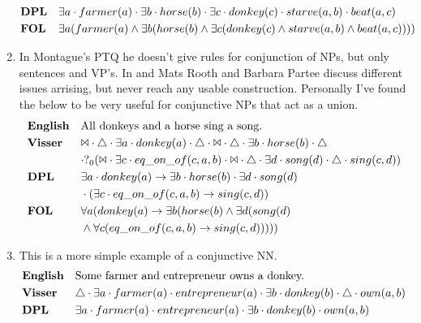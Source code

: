 \documentclass[12pt]{article}
\begin{document}
\begin{enumerate}
\begin{align*}
&\text{\textbf{DPL}}&&\exists a \cdot farmer(a) \cdot \exists b \cdot horse(b) \cdot \exists c \cdot donkey(c) \cdot starve(a,b) \cdot beat(a,c) \\
&\text{\textbf{FOL}}&&\exists a(farmer(a) \wedge \exists b(horse(b) \wedge \exists c(donkey(c) \wedge starve(a,b) \wedge beat(a,c)))) \\
\end{align*}
\item
In Montague's PTQ\cite{montague1973proper} he doesn't give rules for conjunction of NPs, but only sentences and VP's. In \cite{rooth1982conjunction} and \cite{partee1983generalized} Mats Rooth and Barbara Partee discuss different issues arrising, but never reach any usable construction. Personally I've found the below to be very useful for conjunctive NPs that act as a union.
\begin{align*}
&\text{\textbf{English}}&&\text{All donkeys and a horse sing a song.} \\
&\text{\textbf{Visser}}&&\Bowtie \cdot \triangle \cdot \exists a \cdot donkey(a) \cdot \triangle \cdot \Bowtie \cdot \triangle \cdot \exists b \cdot horse(b) \cdot \triangle\\&&& \cdot ?_0(\Bowtie \cdot \exists c \cdot eq\_on\_of(c,a,b) \cdot \Bowtie \cdot \triangle \cdot \exists d \cdot song(d) \cdot \triangle \cdot sing(c,d)) \\
&\text{\textbf{DPL}}&&\exists a \cdot donkey(a) \rightarrow \exists b \cdot horse(b) \cdot \exists d \cdot song(d)\\&&& \cdot (\exists c \cdot eq\_on\_of(c,a,b) \rightarrow sing(c,d)) \\
&\text{\textbf{FOL}}&&\forall a(donkey(a) \rightarrow \exists b(horse(b) \wedge \exists d(song(d)\\&&& \wedge \forall c(eq\_on\_of(c,a,b) \rightarrow sing(c,d))))) \\
\end{align*}
\item
This is a more simple example of a conjunctive NN.
\begin{align*}
&\text{\textbf{English}}&&\text{Some farmer and entrepreneur owns a donkey.} \\
&\text{\textbf{Visser}}&&\triangle \cdot \exists a \cdot farmer(a) \cdot entrepreneur(a) \cdot  \exists b \cdot donkey(b) \cdot \triangle \cdot own(a,b) \\
&\text{\textbf{DPL}}&&\exists a \cdot farmer(a) \cdot entrepreneur(a) \cdot \exists b \cdot donkey(b) \cdot own(a,b) \\

\end{align*}
\end{enumerate}
\end{document}

